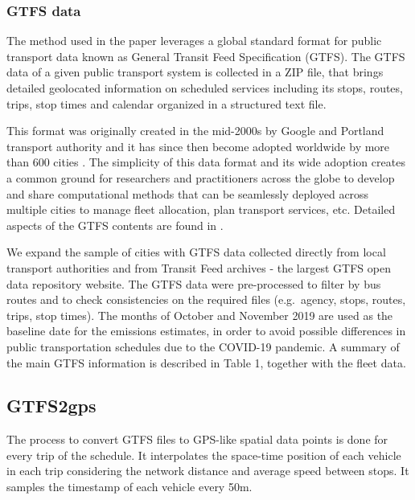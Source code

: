 \documentclass[gc, manuscript]{copernicus}
\begin{document}
\subsubsection{GTFS data}

The method used in the paper leverages a global standard format for
public transport data known as General Transit Feed Specification
(GTFS). The GTFS data of a given public transport system is collected in
a ZIP file, that brings detailed geolocated information on scheduled
services including its stops, routes, trips, stop times and calendar
organized in a structured text file.

This format was originally created in the mid-2000s by Google and
Portland transport authority and it has since then become adopted
worldwide by more than 600 cities
\citep{noauthor_openmobilitydata_nodate}. The simplicity of this data
format and its wide adoption creates a common ground for researchers and
practitioners across the globe to develop and share computational
methods that can be seamlessly deployed across multiple cities to manage
fleet allocation, plan transport services, etc. Detailed aspects of the
GTFS contents are found in \citep{noauthor_reference_nodate}.

We expand the sample of cities with GTFS data collected directly from
local transport authorities and from Transit Feed archives - the largest
GTFS open data repository website. The GTFS data were pre-processed to
filter by bus routes and to check consistencies on the required files
(e.g.~agency, stops, routes, trips, stop times). The months of October
and November 2019 are used as the baseline date for the emissions
estimates, in order to avoid possible differences in public
transportation schedules due to the COVID-19 pandemic. A summary of the
main GTFS information is described in Table 1, together with the fleet
data.

\subsection{GTFS2gps}

The process to convert GTFS files to GPS-like spatial data points is
done for every trip of the schedule. It interpolates the space-time
position of each vehicle in each trip considering the network distance
and average speed between stops. It samples the timestamp of each
vehicle every 50m.
\end{document}
